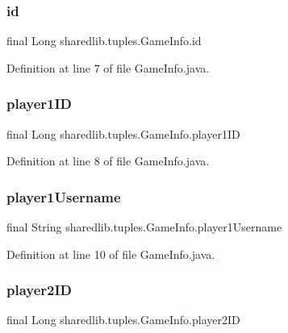 \subsubsection{\texorpdfstring{id}{id}}
{\footnotesize\ttfamily final Long sharedlib.\+tuples.\+Game\+Info.\+id}



Definition at line 7 of file Game\+Info.\+java.

\hypertarget{classsharedlib_1_1tuples_1_1_game_info_af5d977e3c705e0db8a0ab8dec4f353ed}{}\label{classsharedlib_1_1tuples_1_1_game_info_af5d977e3c705e0db8a0ab8dec4f353ed} 
\subsubsection{\texorpdfstring{player1\+ID}{player1ID}}
{\footnotesize\ttfamily final Long sharedlib.\+tuples.\+Game\+Info.\+player1\+ID}



Definition at line 8 of file Game\+Info.\+java.

\hypertarget{classsharedlib_1_1tuples_1_1_game_info_a89da4ca1f9dd359190862a3aae14bdbe}{}\label{classsharedlib_1_1tuples_1_1_game_info_a89da4ca1f9dd359190862a3aae14bdbe} 
\subsubsection{\texorpdfstring{player1\+Username}{player1Username}}
{\footnotesize\ttfamily final String sharedlib.\+tuples.\+Game\+Info.\+player1\+Username}



Definition at line 10 of file Game\+Info.\+java.

\hypertarget{classsharedlib_1_1tuples_1_1_game_info_aa3a82b92a42c7b61c18e2a214bc5a099}{}\label{classsharedlib_1_1tuples_1_1_game_info_aa3a82b92a42c7b61c18e2a214bc5a099} 
\subsubsection{\texorpdfstring{player2\+ID}{player2ID}}
{\footnotesize\ttfamily final Long sharedlib.\+tuples.\+Game\+Info.\+player2\+ID}



